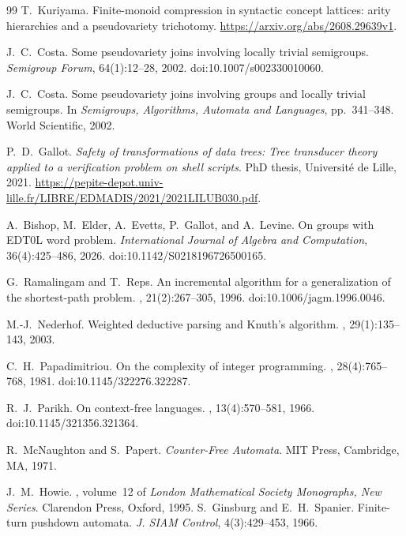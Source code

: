 \documentclass[11pt]{article}
\numberwithin{equation}{section}
\theoremstyle{plain}
\theoremstyle{definition}
\theoremstyle{remark}
\theoremstyle{plain}
\begin{document}
\begin{thebibliography}{99}
T.~Kuriyama.
\newblock Finite-monoid compression in syntactic concept lattices: arity
hierarchies and a pseudovariety trichotomy.
\newblock \url{https://arxiv.org/abs/2608.29639v1}.

J.~C.~Costa.
\newblock Some pseudovariety joins involving locally trivial semigroups.
\newblock \emph{Semigroup Forum}, 64(1):12--28, 2002.
\newblock doi:10.1007/s002330010060.

J.~C.~Costa.
\newblock Some pseudovariety joins involving groups and locally trivial semigroups.
\newblock In \emph{Semigroups, Algorithms, Automata and Languages},
pp.~341--348. World Scientific, 2002.

P.~D.~Gallot.
\newblock \emph{Safety of transformations of data trees: Tree transducer
theory applied to a verification problem on shell scripts}.
\newblock PhD thesis, Universit\'e de Lille, 2021.
\newblock
\url{https://pepite-depot.univ-lille.fr/LIBRE/EDMADIS/2021/2021LILUB030.pdf}.

A.~Bishop, M.~Elder, A.~Evetts, P.~Gallot, and A.~Levine.
\newblock On groups with EDT0L word problem.
\newblock \emph{International Journal of Algebra and Computation},
36(4):425--486, 2026.
\newblock doi:10.1142/S0218196726500165.

G.~Ramalingam and T.~Reps.
\newblock An incremental algorithm for a generalization of the shortest-path problem.
, 21(2):267--305, 1996.
\newblock doi:10.1006/jagm.1996.0046.

M.-J.~Nederhof.
\newblock Weighted deductive parsing and {K}nuth's algorithm.
, 29(1):135--143, 2003.

C.~H.~Papadimitriou.
\newblock On the complexity of integer programming.
, 28(4):765--768, 1981.
\newblock doi:10.1145/322276.322287.

R.~J.~Parikh.
\newblock On context-free languages.
, 13(4):570--581, 1966.
\newblock doi:10.1145/321356.321364.

R.~McNaughton and S.~Papert.
\newblock \emph{Counter-Free Automata}.
\newblock MIT Press, Cambridge, MA, 1971.

J.~M.~Howie.
, volume~12 of {\em London
Mathematical Society Monographs, New Series}.
\newblock Clarendon Press, Oxford, 1995.
S.~Ginsburg and E.~H.~Spanier.
\newblock Finite-turn pushdown automata.
\newblock \emph{J. SIAM Control}, 4(3):429--453, 1966.

\end{thebibliography}
\end{document}
